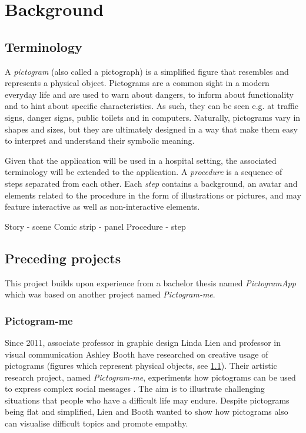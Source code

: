 \chapter{Background}
\label{ch:background}

\section{Terminology}
\label{sec:terminology}

A \emph{pictogram} (also called a pictograph) is a simplified figure that resembles and represents a physical object. Pictograms are a common sight in a modern everyday life and are used to warn about dangers, to inform about functionality and to hint about specific characteristics. As such, they can be seen e.g. at traffic signs, danger signs, public toilets and in computers. Naturally, pictograms vary in shapes and sizes, but they are ultimately designed in a way that make them easy to interpret and understand their symbolic meaning.

Given that the application will be used in a hospital setting, the associated terminology will be extended to the application. A \emph{procedure} is a sequence of steps separated from each other. Each \emph{step} contains a background, an avatar and elements related to the procedure in the form of illustrations or pictures, and may feature interactive as well as non-interactive elements.

Story - scene
Comic strip - panel
Procedure - step

\section{Preceding projects}

This project builds upon experience from a bachelor thesis named \emph{PictogramApp} which was based on another project named \emph{Pictogram-me}.

\subsection{Pictogram-me}

Since 2011, associate professor in graphic design Linda Lien and professor in visual communication Ashley Booth have researched on creative usage of pictograms (figures which represent physical objects, see \ref{sec:terminology}). Their artistic research project, named \emph{Pictogram-me}, experiments how pictograms can be used to express complex social messages \parencite{lien2018}. The aim is to illustrate challenging situations that people who have a difficult life may endure. Despite pictograms being flat and simplified, Lien and Booth wanted to show how pictograms also can visualise difficult topics and promote empathy.

